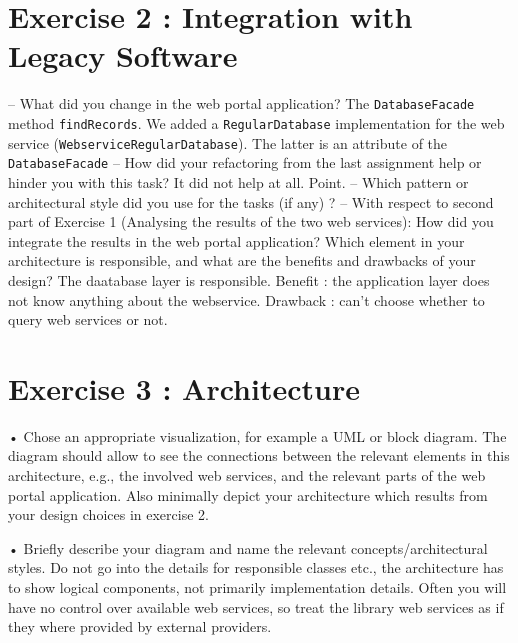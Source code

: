 \section{Exercise 2 : Integration with Legacy Software}

    – What did you change in the web portal application?
    The \texttt{DatabaseFacade} method \texttt{findRecords}. We added a \texttt{RegularDatabase} implementation for the web service (\texttt{WebserviceRegularDatabase}). The latter is an attribute of the \texttt{DatabaseFacade}
    – How did your refactoring from the last assignment help or hinder you with
    this task?
    It did not help at all. Point.
    – Which pattern or architectural style did you use for the tasks (if any) ?
    – With respect to second part of Exercise 1 (Analysing the results of the two
    web services): How did you integrate the results in the web portal application?
    Which element in your architecture is responsible, and what are the benefits
    and drawbacks of your design?
    The daatabase layer is responsible. Benefit : the application layer does not know anything about the webservice. Drawback : can't choose whether to query web services or not.

\section{Exercise 3 : Architecture}

    • Chose an appropriate visualization, for example a UML or block diagram. The
    diagram should allow to see the connections between the relevant elements in this
    architecture, e.g., the involved web services, and the relevant parts of the web
    portal application. Also minimally depict your architecture which results from
    your design choices in exercise 2.

    • Briefly describe your diagram and name the relevant concepts/architectural styles.
    Do not go into the details for responsible classes etc., the architecture has to show
    logical components, not primarily implementation details. Often you will have no
    control over available web services, so treat the library web services as if they where
    provided by external providers.
